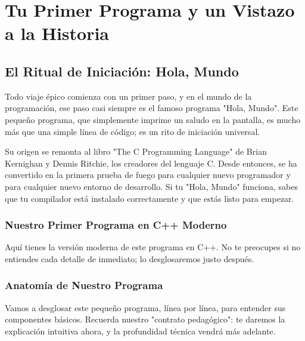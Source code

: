 \section{Tu Primer Programa y un Vistazo a la Historia}
\label{sec:tu_primer_programa}


\subsection{El Ritual de Iniciación: Hola, Mundo}
\label{subsec:ritual_hola_mundo}

Todo viaje épico comienza con un primer paso, y en el mundo de la programación, ese paso casi siempre es el famoso programa "Hola, Mundo". Este pequeño programa, que simplemente imprime un saludo en la pantalla, es mucho más que una simple línea de código; es un rito de iniciación universal.

Su origen se remonta al libro "The C Programming Language" de Brian Kernighan y Dennis Ritchie, los creadores del lenguaje C. Desde entonces, se ha convertido en la primera prueba de fuego para cualquier nuevo programador y para cualquier nuevo entorno de desarrollo. Si tu "Hola, Mundo" funciona, sabes que tu compilador está instalado correctamente y que estás listo para empezar.

\subsubsection{Nuestro Primer Programa en C++ Moderno}
Aquí tienes la versión moderna de este programa en C++. No te preocupes si no entiendes cada detalle de inmediato; lo desglosaremos justo después.



\subsubsection{Anatomía de Nuestro Programa}
Vamos a desglosar este pequeño programa, línea por línea, para entender sus componentes básicos. Recuerda nuestro "contrato pedagógico": te daremos la explicación intuitiva ahora, y la profundidad técnica vendrá más adelante.

